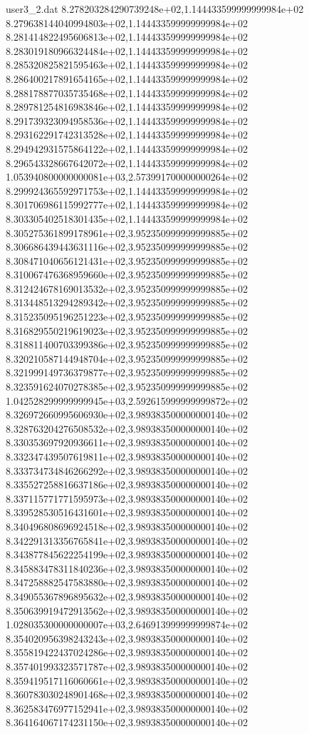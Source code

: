 \begin{filecontents}{user3_2.dat}
8.278203284290739248e+02,1.144433599999999984e+02
8.279638144040994803e+02,1.144433599999999984e+02
8.281414822495606813e+02,1.144433599999999984e+02
8.283019180966324484e+02,1.144433599999999984e+02
8.285320825821595463e+02,1.144433599999999984e+02
8.286400217891654165e+02,1.144433599999999984e+02
8.288178877035735468e+02,1.144433599999999984e+02
8.289781254816983846e+02,1.144433599999999984e+02
8.291739323094958536e+02,1.144433599999999984e+02
8.293162291742313528e+02,1.144433599999999984e+02
8.294942931575864122e+02,1.144433599999999984e+02
8.296543328667642072e+02,1.144433599999999984e+02
1.053940800000000081e+03,2.573991700000000264e+02
8.299924365592971753e+02,1.144433599999999984e+02
8.301706986115992777e+02,1.144433599999999984e+02
8.303305402518301435e+02,1.144433599999999984e+02
8.305275361899178961e+02,3.952350999999999885e+02
8.306686439443631116e+02,3.952350999999999885e+02
8.308471040656121431e+02,3.952350999999999885e+02
8.310067476368959660e+02,3.952350999999999885e+02
8.312424678169013532e+02,3.952350999999999885e+02
8.313448513294289342e+02,3.952350999999999885e+02
8.315235095196251223e+02,3.952350999999999885e+02
8.316829550219619023e+02,3.952350999999999885e+02
8.318811400703399386e+02,3.952350999999999885e+02
8.320210587144948704e+02,3.952350999999999885e+02
8.321999149736379877e+02,3.952350999999999885e+02
8.323591624070278385e+02,3.952350999999999885e+02
1.042528299999999945e+03,2.592615999999999872e+02
8.326972660995606930e+02,3.989383500000000140e+02
8.328763204276508532e+02,3.989383500000000140e+02
8.330353697920936611e+02,3.989383500000000140e+02
8.332347439507619811e+02,3.989383500000000140e+02
8.333734734846266292e+02,3.989383500000000140e+02
8.335527258816637186e+02,3.989383500000000140e+02
8.337115771771595973e+02,3.989383500000000140e+02
8.339528530516431601e+02,3.989383500000000140e+02
8.340496808696924518e+02,3.989383500000000140e+02
8.342291313356765841e+02,3.989383500000000140e+02
8.343877845622254199e+02,3.989383500000000140e+02
8.345883478311840236e+02,3.989383500000000140e+02
8.347258882547583880e+02,3.989383500000000140e+02
8.349055367896895632e+02,3.989383500000000140e+02
8.350639919472913562e+02,3.989383500000000140e+02
1.028035300000000007e+03,2.646913999999999874e+02
8.354020956398243243e+02,3.989383500000000140e+02
8.355819422437024286e+02,3.989383500000000140e+02
8.357401993323571787e+02,3.989383500000000140e+02
8.359419517116060661e+02,3.989383500000000140e+02
8.360783030248901468e+02,3.989383500000000140e+02
8.362583476977152941e+02,3.989383500000000140e+02
8.364164067174231150e+02,3.989383500000000140e+02

\end{filecontents}
